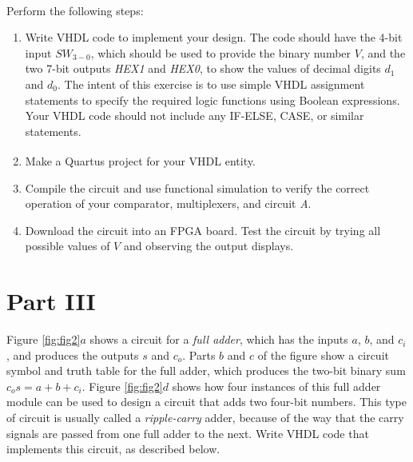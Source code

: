 \documentclass[epsfig,10pt,fullpage]{article}
\begin{document}
~\\
Perform the following steps:

\begin{enumerate}
\item Write VHDL code to implement your design. The code
should have the 4-bit input $SW_{3-0}$, which should be
used to provide the binary number $V$, and the two 7-bit outputs {\it HEX1} and {\it HEX0},
to show the values of decimal digits $d_1$ and $d_0$. 
The intent of this exercise is to use simple VHDL assignment
statements to specify the required logic functions using Boolean
expressions. Your VHDL code should not include any IF-ELSE, CASE, or
similar statements. 
\item Make a Quartus\textsuperscript{\textregistered} project for your VHDL entity.
\item Compile the circuit and use functional simulation to verify the correct operation of
your comparator, multiplexers, and circuit {\it A}.
\item Download the circuit into an FPGA board.  Test the circuit by trying all possible 
values of $V$ and observing the output displays.
\end{enumerate}

\section*{Part III}
Figure \ref{fig:fig2}$a$ shows a circuit for a {\it full adder}, 
which has the inputs $a$, $b$, and $c_i$,
and produces the outputs $s$ and $c_o$. Parts $b$ and $c$ of the figure show a circuit
symbol and truth table for the full adder, which produces the two-bit binary sum
$c_o s = a + b + c_i$. Figure \ref{fig:fig2}$d$ shows how four instances of this full adder module
can be used to design a circuit that adds two four-bit numbers. This type of circuit is
usually called a {\it ripple-carry} adder, because of the way that the carry signals are 
passed from one full adder to the next. Write VHDL code that implements this circuit,
as described below.
\end{document}
